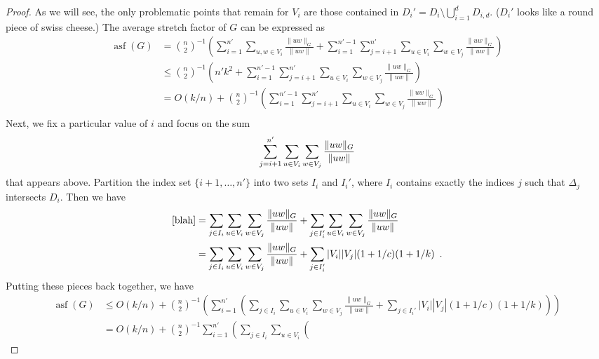 \documentclass{patmorin}
\DeclareMathOperator{\asf}{asf}
\begin{document}
\begin{proof}
  As we will see, the only problematic points that remain for $V_i$
  are those contained in $D_i'=D_i\setminus\bigcup_{i=1}^d D_{i,d}$.
  ($D_i'$ looks like a round piece of swiss cheese.)  The average stretch
  factor of $G$ can be expressed as
  \begin{align*}
    \asf(G) 
      & = 
      \binom n2^{-1}\left(
        \sum_{i=1}^{n'}\sum_{u,w\in V_i}\frac{\|uw\|_G}{\|uw\|}  
         + \sum_{i=1}^{n'-1}\sum_{j={i+1}}^{n'}
            \sum_{u\in V_i}\sum_{w\in V_j}\frac{\|uw\|_G}{\|uw\|}
      \right)  \\
      & \le 
         \binom n2^{-1}\left(n'k^2 
          + \sum_{i=1}^{n'-1}\sum_{j={i+1}}^{n'}
           \sum_{u\in V_i}\sum_{w\in V_j}\frac{\|uw\|_G}{\|uw\|}
      \right)  \\
      & = 
         O(k/n) + \binom n2^{-1}\left(  
          \sum_{i=1}^{n'-1}\sum_{j={i+1}}^{n'}
           \sum_{u\in V_i}\sum_{w\in V_j}\frac{\|uw\|_G}{\|uw\|}
      \right)  \\
   \end{align*}
   Next, we fix a particular value of $i$ and focus on the sum
   \begin{equation}
       \sum_{j={i+1}}^{n'}
          \sum_{u\in V_i}\sum_{w\in V_j}\frac{\|uw\|_G}{\|uw\|}
          \eqlabel{blah}
   \end{equation}
   that appears above.
   Partition the index set $\{i+1,\ldots,n'\}$ into two sets $I_i$
   and $I_i'$, where $I_i$ contains exactly the indices $j$ such that
   $\Delta_j$ intersects $D_i$.
   Then we have
   \begin{align*}
     \eqref{blah} 
      & = \sum_{j\in I_i}
           \sum_{u\in V_i}\sum_{w\in V_j}\frac{\|uw\|_G}{\|uw\|}
         + \sum_{j\in I_i'}
           \sum_{u\in V_i}\sum_{w\in V_j}\frac{\|uw\|_G}{\|uw\|} \\
      & = \sum_{j\in I_i}
          \sum_{u\in V_i}\sum_{w\in V_j}\frac{\|uw\|_G}{\|uw\|} 
         + \sum_{j\in I_i'} |V_i||V_j|(1+1/c)(1+1/k) \enspace .
   \end{align*}
   Putting these pieces back together, we have
   \begin{align*}
     \asf(G) & \le O(k/n) + \binom{n}{2}^{-1}\left(
       \sum_{i=1}^{n'}\left(\sum_{j\in I_i}
          \sum_{u\in V_i}\sum_{w\in V_j}\frac{\|uw\|_G}{\|uw\|} 
         + \sum_{j\in I_i'} |V_i||V_j|(1+1/c)(1+1/k)\right)\right) \\
      & = O(k/n) +\binom{n}{2}^{-1}
       \sum_{i=1}^{n'}\left(\sum_{j\in I_i}
          \sum_{u\in V_i}\left(

\end{align*}
\end{proof}
\end{document}
